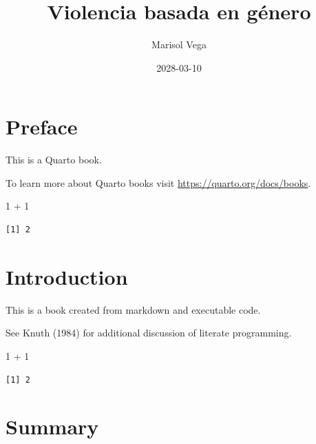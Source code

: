 \documentclass[
  letterpaper,
  DIV=11,
  numbers=noendperiod]{scrreprt}
\title{Violencia basada en género}
\author{Marisol Vega}
\date{2028-03-10}
\newenvironment{Shaded}{\begin{snugshade}}{\end{snugshade}}
\newcommand{\DecValTok}[1]{\textcolor[rgb]{0.68,0.00,0.00}{#1}}
\newcommand{\SpecialCharTok}[1]{\textcolor[rgb]{0.37,0.37,0.37}{#1}}
\renewcommand*\contentsname{Table of contents}
\newcommand\contentsname{Table of contents}
\begin{document}
\maketitle

\renewcommand*\contentsname{Table of contents}
{
\setcounter{tocdepth}{2}
\tableofcontents
}


\chapter*{Preface}\label{preface}


This is a Quarto book.

To learn more about Quarto books visit
\url{https://quarto.org/docs/books}.

\begin{Shaded}
\begin{Highlighting}[]
\DecValTok{1} \SpecialCharTok{+} \DecValTok{1}
\end{Highlighting}
\end{Shaded}

\begin{verbatim}
[1] 2
\end{verbatim}


\chapter{Introduction}\label{introduction}

This is a book created from markdown and executable code.

See Knuth (1984) for additional discussion of literate programming.

\begin{Shaded}
\begin{Highlighting}[]
\DecValTok{1} \SpecialCharTok{+} \DecValTok{1}
\end{Highlighting}
\end{Shaded}

\begin{verbatim}
[1] 2
\end{verbatim}


\chapter{Summary}\label{summary}
\end{document}
